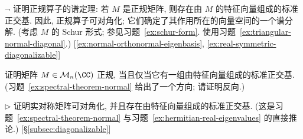 \begin{prob}\label{ex:spectral-theorem-normal}
$\neg$ 证明正规算子的谱定理: 若 $M$ 是正规矩阵, 则存在由 $M$ 的特征向量组成的标准正交基. 因此, 正规算子可对角化; 它们确定了其作用所在的向量空间的一个谱分解. (考虑 $M$ 的 Schur 形式; 参见习题~\ref{ex:schur-form}. 使用习题~\ref{ex:triangular-normal-diagonal}.) [\ref{ex:normal-orthonormal-eigenbasis}, \ref{ex:real-symmetric-diagonalizable}]
\end{prob}

\begin{prob}\label{ex:normal-orthonormal-eigenbasis}
证明矩阵 $M\in\mathcal{M}_n(\CC)$ 正规, 当且仅当它有一组由特征向量组成的标准正交基. (习题~\ref{ex:spectral-theorem-normal} 给出了一个方向; 请证明反向.)
\end{prob}

\begin{prob}\label{ex:real-symmetric-diagonalizable}
$\triangleright$ 证明实对称矩阵可对角化, 并且存在由特征向量组成的标准正交基. (这是习题~\ref{ex:spectral-theorem-normal} 与习题~\ref{ex:hermitian-real-eigenvalues} 的直接推论.) [§\ref{subsec:diagonalizable}]
\end{prob}
